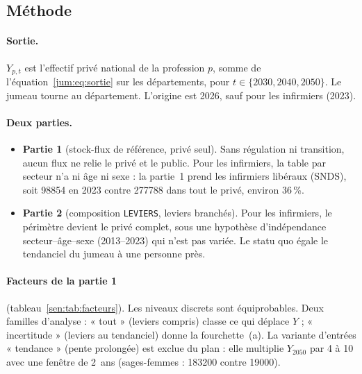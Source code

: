 \subsection{Méthode}\label{sen:methode}

\paragraph{Sortie.} $Y_{p,t}$ est l'effectif privé national de la profession $p$, somme de
l'équation~\eqref{jum:eq:sortie} sur les départements, pour $t \in \{2030, 2040, 2050\}$. Le jumeau tourne au
département. L'origine est 2026, sauf pour les infirmiers (2023).

\paragraph{Deux parties.}
\begin{itemize}
  \item \textbf{Partie 1} (stock-flux de référence, privé seul). Sans régulation ni transition, aucun flux ne
        relie le privé et le public. Pour les infirmiers, la table par secteur n'a ni âge ni sexe : la partie~1
        prend les infirmiers libéraux (SNDS), soit \num{98854}\mesure{} en 2023 contre \num{277788}\mesure{}
        dans tout le privé, environ 36\derive{}\,\%.
  \item \textbf{Partie 2} (composition \texttt{LEVIERS}, leviers branchés). Pour les infirmiers, le périmètre
        devient le privé complet, sous une hypothèse d'indépendance secteur--âge--sexe (2013--2023) qui n'est pas
        variée. Le statu quo égale le tendanciel du jumeau à une personne près\mesure{}.
\end{itemize}

\paragraph{Facteurs de la partie 1} (tableau~\ref{sen:tab:facteurs}). Les niveaux discrets sont
équiprobables\suppose{}. Deux familles d'analyse : « tout » (leviers compris) classe ce qui déplace $Y$ ;
« incertitude » (leviers au tendanciel) donne la fourchette~(a). La variante d'entrées « tendance » (pente
prolongée) est exclue du plan : elle multiplie $Y_{2050}$ par 4 à 10\mesure{} avec une fenêtre de 2~ans
(sages-femmes : \num{183200} contre \num{19000}\mesure{}).

